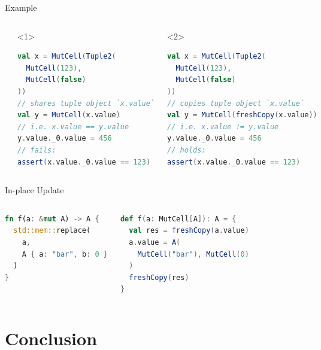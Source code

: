 \begin{frame}[fragile]{Example}
\begin{columns}[T]
\begin{lstlisting}[language=Rust]
let x = (
  123,
  false
);
// copies `x`
let mut y = x;

y.0 = 456;
// holds:
assert!(x.0 == 123)
\end{lstlisting}
\begin{onlyenv}<1>
\begin{lstlisting}[language=Scala]
val x = MutCell(Tuple2(
  MutCell(123),
  MutCell(false)
))
// shares tuple object `x.value`
val y = MutCell(x.value)
// i.e. x.value == y.value
y.value._0.value = 456
// fails:
assert(x.value._0.value == 123)
\end{lstlisting}
\end{onlyenv}
\begin{onlyenv}<2>
\begin{lstlisting}[language=Scala]
val x = MutCell(Tuple2(
  MutCell(123),
  MutCell(false)
))
// copies tuple object `x.value`
val y = MutCell(freshCopy(x.value))
// i.e. x.value != y.value
y.value._0.value = 456
// holds:
assert(x.value._0.value == 123)
\end{lstlisting}
\end{onlyenv}
\end{columns}
\end{frame}

\begin{frame}[fragile]{In-place Update}
\begin{columns}[T]
\begin{lstlisting}[language=Rust]
fn f(a: &mut A) -> A {
  std::mem::replace(
    a,
    A { a: "bar", b: 0 }
  )
}
\end{lstlisting}
\begin{lstlisting}[language=Scala]
def f(a: MutCell[A]): A = {
  val res = freshCopy(a.value)
  a.value = A(
    MutCell("bar"), MutCell(0)
  )
  freshCopy(res)
}
\end{lstlisting}
\end{columns}
\end{frame}


\section{Conclusion}

